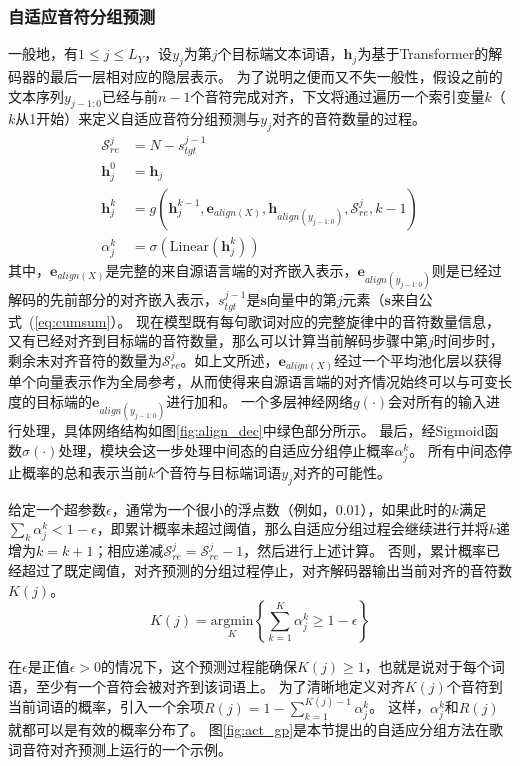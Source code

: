 \subsubsection{自适应音符分组预测}
一般地，有$1 \leq j \leq L_Y$，设$y_j$为第$j$个目标端文本词语，$\mathbf{h}_j$为基于Transformer的解码器的最后一层相对应的隐层表示。
为了说明之便而又不失一般性，假设之前的文本序列$y_{j-1:0}$已经与前$n-1$个音符完成对齐，下文将通过遍历一个索引变量$k$（$k$从1开始）来定义自适应音符分组预测与$y_j$对齐的音符数量的过程。
\begin{align}
    \mathcal{S}_{re}^j &= N -s^{j-1}_{tgt} \\
     \mathbf{h}_j^0 &= \mathbf{h}_j  \\
     \mathbf{h}_j^k &= g(\mathbf{h}_j^{k-1}, \mathbf{e}_{align(X)}, \mathbf{h}_{align(y_{j-1:0})}, \mathcal{S}_{re}^j, k-1) \\
     \alpha_j^k &= \sigma(\text{Linear}(\mathbf{h}_j^k))
\end{align}
其中，$\mathbf{e}_{align(X)}$是完整的来自源语言端的对齐嵌入表示，$\mathbf{e}_{align(y_{j-1:0})}$则是已经过解码的先前部分的对齐嵌入表示，$s^{j-1}_{tgt}$是$\mathbf{s}$向量中的第$j$元素（$\mathbf{s}$来自公式~(\ref{eq:cumsum}）。
现在模型既有每句歌词对应的完整旋律中的音符数量信息，又有已经对齐到目标端的音符数量，那么可以计算当前解码步骤中第$j$时间步时，剩余未对齐音符的数量为$\mathcal{S}_{re}^j$。如上文所述，$\mathbf{e}_{align(X)}$经过一个平均池化层以获得单个向量表示作为全局参考，从而使得来自源语言端的对齐情况始终可以与可变长度的目标端的$\mathbf{e}_{align(y_{j-1:0})}$进行加和。
一个多层神经网络$g(\cdot)$会对所有的输入进行处理，具体网络结构如图\ref{fig:align_dec}中绿色部分所示。
最后，经Sigmoid函数$\sigma(\cdot)$处理，模块会这一步处理中间态的自适应分组停止概率$\alpha_j^k$。
所有中间态停止概率的总和表示当前$k$个音符与目标端词语$y_j$对齐的可能性。

给定一个超参数$\epsilon$，通常为一个很小的浮点数（例如，0.01），如果此时的$k$满足$\sum_k \alpha_j^k < 1-\epsilon$，即累计概率未超过阈值，那么自适应分组过程会继续进行并将$k$递增为$k=k+1$；相应递减$\mathcal{S}_{re}^j=\mathcal{S}_{re}^j-1$，然后进行上述计算。
否则，累计概率已经超过了既定阈值，对齐预测的分组过程停止，对齐解码器输出当前对齐的音符数$K(j)$。
\begin{equation}
\label{eq:Kj}
    K(j) = \underset{K}{\mathrm{argmin}} \left\{\sum_{k=1}^K \alpha_j^k \geq 1-\epsilon \right\}
\end{equation}

在$\epsilon$是正值$\epsilon>0$的情况下，这个预测过程能确保$K(j)\geq1$，也就是说对于每个词语，至少有一个音符会被对齐到该词语上。
为了清晰地定义对齐$K(j)$个音符到当前词语的概率，引入一个余项$R(j) = 1-\sum_{k=1}^{K(j)-1} \alpha_j^k$。
这样，$\alpha_j^k$和$R(j)$就都可以是有效的概率分布了。
图\ref{fig:act_gp}是本节提出的自适应分组方法在歌词音符对齐预测上运行的一个示例。

